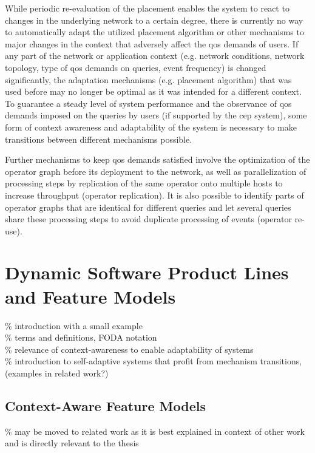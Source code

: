 While periodic re-evaluation of the placement enables the system to react to changes in the underlying network to a certain degree, there is currently no way to automatically adapt the utilized placement algorithm or other mechanisms to major changes in the context that adversely affect the \gls{qos} demands of users. If any part of the network or application context (e.g. network conditions, network topology, type of \gls{qos} demands on queries, event frequency) is changed significantly, the adaptation mechanisms (e.g. placement algorithm) that was used before may no longer be optimal as it was intended for a different context. To guarantee a steady level of system performance and the observance of \gls{qos} demands imposed on the queries by users (if supported by the \gls{cep} system), some form of context awareness and adaptability of the system is necessary to make transitions between different mechanisms possible.

Further mechanisms to keep \gls{qos} demands satisfied involve the optimization of the operator graph before its deployment to the network, as well as parallelization of processing steps by replication of the same operator onto multiple hosts to increase throughput (operator replication). It is also possible to identify parts of operator graphs that are identical for different queries and let several queries share these processing steps to avoid duplicate processing of events (operator re-use).

\section{Dynamic Software Product Lines and Feature Models}
\% introduction with a small example \\
\% terms and definitions, FODA notation \\
\% relevance of context-awareness to enable adaptability of systems \\
\% introduction to self-adaptive systems that profit from mechanism transitions, (examples in related work?)

\subsection{Context-Aware Feature Models} 
\% may be moved to related work as it is best explained in context of other work and is directly relevant to the thesis


